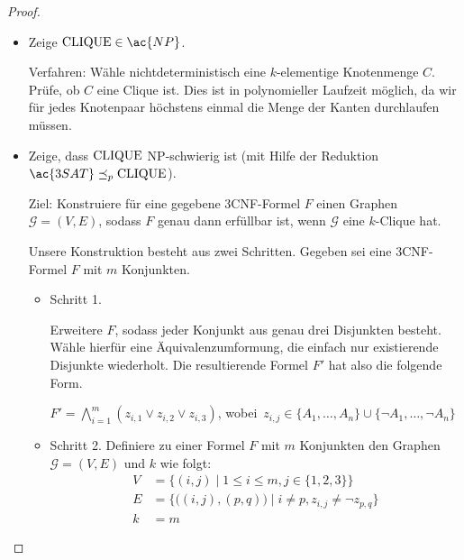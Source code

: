 \begin{proof}
    \
    \begin{itemize}
     \item Zeige $\CLIQUE\in \ac{NP}$.
     
     Verfahren: 
     Wähle nichtdeterministisch eine $k$-elementige Knotenmenge $C$.
     Prüfe, ob $C$ eine Clique ist.
     Dies ist in polynomieller Laufzeit möglich, da wir für jedes Knotenpaar höchstens einmal die Menge der Kanten durchlaufen müssen.
     
     \item Zeige, dass $\operatorname{CLIQUE}$ \ac{NP}-schwierig ist (mit Hilfe der Reduktion  $\ac{3SAT} \preceq_p \CLIQUE$).
     
     Ziel: Konstruiere für eine gegebene 3CNF-Formel $F$ einen Graphen $\mathcal{G}=(V,E)$, sodass $F$ genau dann erfüllbar ist, wenn $\mathcal{G}$ eine $k$-Clique hat.
     
     Unsere Konstruktion besteht aus zwei Schritten.
     Gegeben sei eine 3CNF-Formel $F$ mit $m$ Konjunkten.
     
     \begin{itemize}
      \item Schritt 1.
      
      Erweitere $F$, sodass jeder Konjunkt aus genau drei Disjunkten besteht.
      Wähle hierfür eine Äquivalenzumformung, die einfach nur existierende Disjunkte wiederholt.
      Die resultierende Formel $F'$ hat also die folgende Form.
      
      $F' = \bigwedge\limits_{i=1}^m (z_{i,1}\lor z_{i,2}\lor z_{i,3})$, wobei\ $z_{i,j}\in \{A_1,\dots,A_n\}\cup\{\neg A_1,\dots,\neg A_n\}$
      \item Schritt 2.
       Definiere zu einer Formel $F$ mit $m$ Konjunkten den Graphen $\mathcal{G} = (V,E)$ und $k$ wie folgt:
	\begin{align*}
		V &= \{ (i,j) \mid 1\leq i\leq m, j\in\{1,2,3\} \}\\
		E &= \{\big((i,j),(p,q)\big) \mid i\neq p, z_{i,j}\neq\neg z_{p,q}\}\\
		k &= m
	\end{align*}
     \end{itemize}


\end{itemize}
\end{proof}
